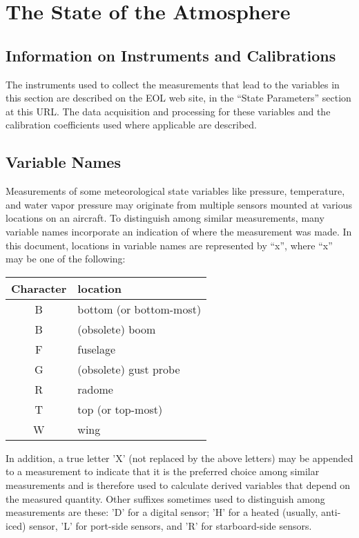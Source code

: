 \documentclass[
  english,
]{book}
\begin{document}
\hypertarget{the-state-of-the-atmosphere}{%
\chapter{The State of the
Atmosphere}\label{the-state-of-the-atmosphere}}

\hypertarget{information-on-instruments-and-calibrations}{%
\section{Information on Instruments and
Calibrations}\label{information-on-instruments-and-calibrations}}

The instruments used to collect the measurements that lead to the
variables in this section are described on the EOL web site, in the
``State Parameters'' section at this URL. The data acquisition and
processing for these variables and the calibration coefficients used
where applicable are described.

\hypertarget{variable-names}{%
\section{Variable Names}\label{variable-names}}

Measurements of some meteorological state variables like pressure,
temperature, and water vapor pressure may originate from multiple
sensors mounted at various locations on an aircraft. To distinguish
among similar measurements, many variable names incorporate an
indication of where the measurement was made. In this document,
locations in variable names are represented by ``x'', where ``x'' may be
one of the following:

\begin{table}
\centering
\begin{tabular}{c|l}
\hline
Character & location\\
\hline
B & bottom (or bottom-most)\\
\hline
B & (obsolete) boom\\
\hline
F & fuselage\\
\hline
G & (obsolete) gust probe\\
\hline
R & radome\\
\hline
T & top (or top-most)\\
\hline
W & wing\\
\hline
\end{tabular}
\end{table}

In addition, a true letter 'X' (not replaced by the above letters) may
be appended to a measurement to indicate that it is the preferred choice
among similar measurements and is therefore used to calculate derived
variables that depend on the measured quantity. Other suffixes sometimes
used to distinguish among measurements are these: 'D' for a digital
sensor; 'H' for a heated (usually, anti-iced) sensor, 'L' for port-side
sensors, and 'R' for starboard-side sensors.
\end{document}
